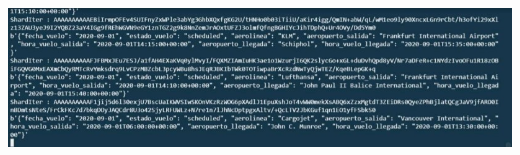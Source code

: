 \documentclass{article}
\begin{document}
	\newpage
    \begin{center}
		\includegraphics[width=15cm]{./images/5} 
	\end{center}
\end{document}

